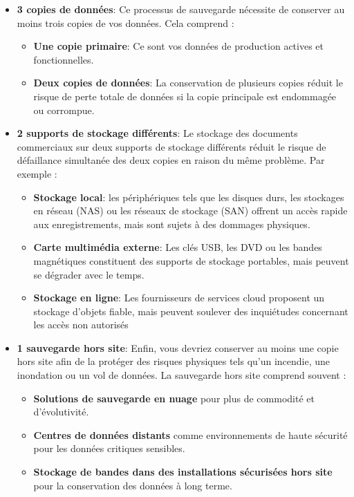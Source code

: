 \begin{itemize}
	\item \textbf{3 copies de données}:
	Ce processus de sauvegarde nécessite de conserver au moins trois copies de vos données. Cela comprend :
	\begin{itemize}
		\item \textbf{Une copie primaire}: Ce sont vos données de production actives et fonctionnelles.	
		\item \textbf{Deux copies de données}: La conservation de plusieurs copies réduit le risque de perte totale de données si la copie principale est endommagée ou corrompue.
	\end{itemize}

	\item \textbf{2 supports de stockage différents}:
	Le stockage des documents commerciaux sur deux supports de stockage différents réduit le risque de défaillance simultanée des deux copies en raison du même problème. Par exemple :
	\begin{itemize}
		\item \textbf{Stockage local}: les périphériques tels que les disques durs, les stockages en réseau (NAS) ou les réseaux de stockage (SAN) offrent un accès rapide aux enregistrements, mais sont sujets à des dommages physiques.	
		\item \textbf{Carte multimédia externe}: Les clés USB, les DVD ou les bandes magnétiques constituent des supports de stockage portables, mais peuvent se dégrader avec le temps.
		\item \textbf{Stockage en ligne}: Les fournisseurs de services cloud proposent un stockage d'objets fiable, mais peuvent soulever des inquiétudes concernant les accès non autorisés
	\end{itemize}

	\newpage

	\item \textbf{1 sauvegarde hors site}:
	Enfin, vous devriez conserver au moins une copie hors site afin de la protéger des risques physiques tels qu'un incendie, une inondation ou un vol de données. La sauvegarde hors site comprend souvent :
	\begin{itemize}
		\item \textbf{Solutions de sauvegarde en nuage} pour plus de commodité et d'évolutivité.
		\item \textbf{Centres de données distants} comme environnements de haute sécurité pour les données critiques sensibles.
		\item \textbf{Stockage de bandes dans des installations sécurisées hors site} pour la conservation des données à long terme.
	\end{itemize}
\end{itemize}

